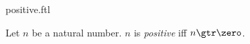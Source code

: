 \documentclass{stex}
\begin{document}
\begin{smodule}{positive.ftl}


\begin{definition}[forthel,id=PositiveDef]
  Let $n$ be a natural number.
  $n$ is \emph{positive} iff $n \gtr \zero$.
\end{definition}

\end{smodule}
\end{document}
